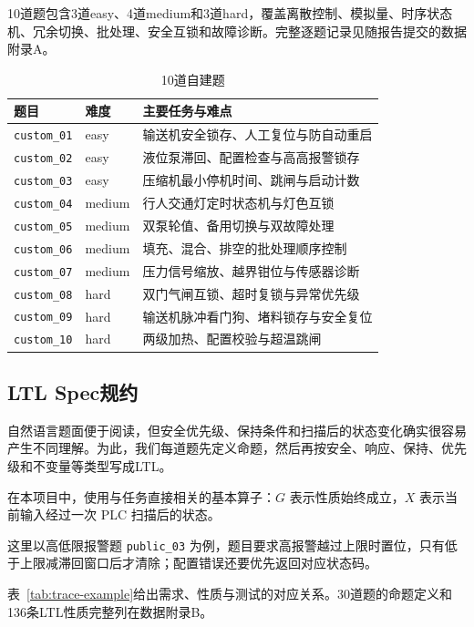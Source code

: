 \documentclass[UTF8,a4paper,zihao=-4]{ctexart}
\begin{document}
10道题包含3道easy、4道medium和3道hard，覆盖离散控制、模拟量、时序状态机、冗余切换、批处理、安全互锁和故障诊断。完整逐题记录见随报告提交的数据附录A。

\begin{table}[H]
  \centering
  \small
  \caption{10道自建题}
  \begin{tabularx}{\textwidth}{L{2.0cm}L{1.6cm}X}
    \toprule
    题目  & 难度 & 主要任务与难点\\
    \midrule
    \texttt{custom\_01} & easy & 输送机安全锁存、人工复位与防自动重启\\
    \texttt{custom\_02} & easy & 液位泵滞回、配置检查与高高报警锁存\\
    \texttt{custom\_03}  & easy & 压缩机最小停机时间、跳闸与启动计数\\
    \texttt{custom\_04}  & medium & 行人交通灯定时状态机与灯色互锁\\
    \texttt{custom\_05} & medium & 双泵轮值、备用切换与双故障处理\\
    \texttt{custom\_06} & medium & 填充、混合、排空的批处理顺序控制\\
    \texttt{custom\_07}  & medium & 压力信号缩放、越界钳位与传感器诊断\\
    \texttt{custom\_08} & hard & 双门气闸互锁、超时复锁与异常优先级\\
    \texttt{custom\_09}  & hard & 输送机脉冲看门狗、堵料锁存与安全复位\\
    \texttt{custom\_10}  & hard & 两级加热、配置校验与超温跳闸\\
    \bottomrule
  \end{tabularx}
\end{table}

\subsection{LTL Spec规约}
自然语言题面便于阅读，但安全优先级、保持条件和扫描后的状态变化确实很容易产生不同理解。为此，我们每道题先定义命题，然后再按安全、响应、保持、优先级和不变量等类型写成LTL。

在本项目中，使用与任务直接相关的基本算子：$G$ 表示性质始终成立，$X$ 表示当前输入经过一次 PLC 扫描后的状态。

这里以高低限报警题 \texttt{public\_03} 为例，题目要求高报警越过上限时置位，只有低于上限减滞回窗口后才清除；配置错误还要优先返回对应状态码。

表~\ref{tab:trace-example}给出需求、性质与测试的对应关系。30道题的命题定义和136条LTL性质完整列在数据附录B。
\end{document}
